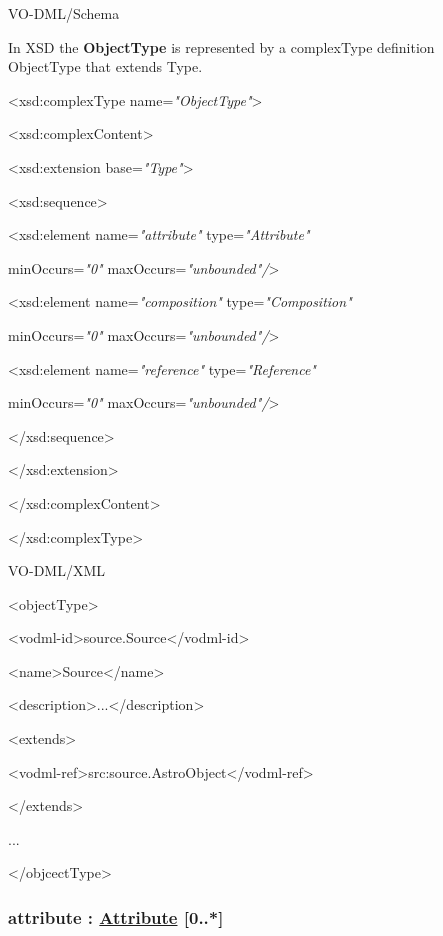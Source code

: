 \documentclass[10pt,a4paper]{ivoa}
\begin{document}
VO-DML/Schema

In XSD the \textbf{ObjectType} is represented by a complexType
definition ObjectType that extends Type.

\textless xsd:complexType name=\emph{"ObjectType"}\textgreater{}

\textless xsd:complexContent\textgreater{}

\textless xsd:extension base=\emph{"Type"}\textgreater{}

\textless xsd:sequence\textgreater{}

\textless xsd:element name=\emph{"attribute"} type=\emph{"Attribute"}

minOccurs=\emph{"0"} maxOccurs=\emph{"unbounded"/}\textgreater{}

\textless xsd:element name=\emph{"composition"}
type=\emph{"Composition"}

minOccurs=\emph{"0"} maxOccurs=\emph{"unbounded"/}\textgreater{}

\textless xsd:element name=\emph{"reference"} type=\emph{"Reference"}

minOccurs=\emph{"0"} maxOccurs=\emph{"unbounded"/}\textgreater{}

\textless/xsd:sequence\textgreater{}

\textless/xsd:extension\textgreater{}

\textless/xsd:complexContent\textgreater{}

\textless/xsd:complexType\textgreater{}

VO-DML/XML

\textless objectType\textgreater{}

\textless vodml-id\textgreater source.Source\textless/vodml-id\textgreater{}

\textless name\textgreater Source\textless/name\textgreater{}

\textless description\textgreater...\textless/description\textgreater{}

\textless extends\textgreater{}

\textless vodml-ref\textgreater src:source.AstroObject\textless/vodml-ref\textgreater{}

\textless/extends\textgreater{}

...

\textless/objcectType\textgreater{}

\hypertarget{attribute-attribute-0..-1}{%
\subsubsection{\texorpdfstring{attribute :
\protect\hyperlink{attribute-extends-role}{Attribute}
{[}0..*{]}}{attribute : Attribute {[}0..*{]}}}\label{attribute-attribute-0..-1}}
\end{document}
